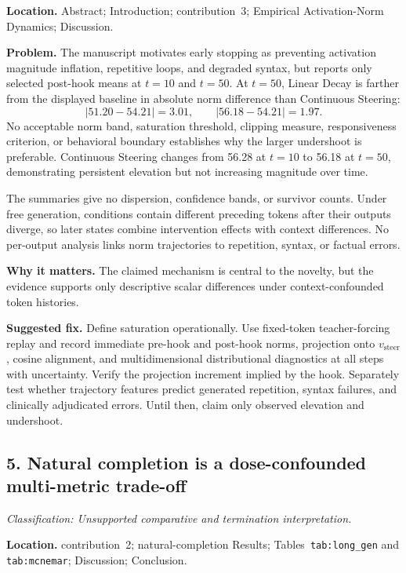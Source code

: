 \documentclass[11pt]{article}
\newcommand{\findinglabel}[1]{\textbf{#1}}
\newcommand{\classification}[1]{\textit{Classification: #1.}}
\begin{document}
\findinglabel{Location.} Abstract; Introduction; contribution~3; Empirical Activation-Norm Dynamics; Discussion.

\findinglabel{Problem.} The manuscript motivates early stopping as preventing activation magnitude inflation, repetitive loops, and degraded syntax, but reports only selected post-hook means at $t=10$ and $t=50$.  At $t=50$, Linear Decay is farther from the displayed baseline in absolute norm difference than Continuous Steering:
\[
|51.20-54.21|=3.01,
\qquad
|56.18-54.21|=1.97.
\]
No acceptable norm band, saturation threshold, clipping measure, responsiveness criterion, or behavioral boundary establishes why the larger undershoot is preferable.  Continuous Steering changes from 56.28 at $t=10$ to 56.18 at $t=50$, demonstrating persistent elevation but not increasing magnitude over time.

The summaries give no dispersion, confidence bands, or survivor counts.  Under free generation, conditions contain different preceding tokens after their outputs diverge, so later states combine intervention effects with context differences.  No per-output analysis links norm trajectories to repetition, syntax, or factual errors.

\findinglabel{Why it matters.} The claimed mechanism is central to the novelty, but the evidence supports only descriptive scalar differences under context-confounded token histories.

\findinglabel{Suggested fix.} Define saturation operationally.  Use fixed-token teacher-forcing replay and record immediate pre-hook and post-hook norms, projection onto $v_{\text{steer}}$, cosine alignment, and multidimensional distributional diagnostics at all steps with uncertainty.  Verify the projection increment implied by the hook.  Separately test whether trajectory features predict generated repetition, syntax failures, and clinically adjudicated errors.  Until then, claim only observed elevation and undershoot.

\subsection*{5. Natural completion is a dose-confounded multi-metric trade-off}

\classification{Unsupported comparative and termination interpretation}

\findinglabel{Location.} contribution~2; natural-completion Results; Tables~\texttt{tab:long\_gen} and \texttt{tab:mcnemar}; Discussion; Conclusion.
\end{document}
